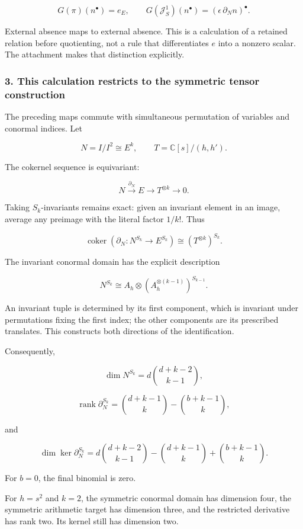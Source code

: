 \[
G(\pi)(n^\bullet)=e_E,
\qquad
G(\mathcal J_S^1)(n^\bullet)
=
(\epsilon\,\partial_Nn)^\bullet.
\]

External absence maps to external absence. This is a calculation of a retained relation before
quotienting, not a rule that differentiates \(e\) into a nonzero scalar. The attachment makes that
distinction explicitly.

\subsubsection{3. This calculation restricts to the symmetric tensor
construction}\label{conormal_tower_pasted:this-calculation-restricts-to-the-symmetric-tensor-construction}

The preceding maps commute with simultaneous permutation of variables and conormal indices. Let

\[
N=I/I^2\cong E^k,\qquad
T=\mathbb C[s]/(h,h').
\]

The cokernel sequence is equivariant:

\[
N\xrightarrow{\partial_N}E\longrightarrow T^{\otimes k}\longrightarrow0.
\]

Taking \(S_k\)-invariants remains exact: given an invariant element in an image, average any
preimage with the literal factor \(1/k!\). Thus

\[
\boxed{
\operatorname{coker}\left(
\partial_N:N^{S_k}\to E^{S_k}
\right)
\cong
(T^{\otimes k})^{S_k}.
}
\]

The invariant conormal domain has the explicit description

\[
\boxed{
N^{S_k}
\cong
A_h\otimes
(A_h^{\otimes(k-1)})^{S_{k-1}}.
}
\]

An invariant tuple is determined by its first component, which is invariant under permutations
fixing the first index; the other components are its prescribed translates. This constructs both
directions of the identification.

Consequently,

\[
\dim N^{S_k}
=
d\binom{d+k-2}{k-1},
\]

\[
\boxed{
\operatorname{rank}\partial_N^{S_k}
=
\binom{d+k-1}{k}
-
\binom{b+k-1}{k},
}
\]

and

\[
\boxed{
\dim\ker\partial_N^{S_k}
=
d\binom{d+k-2}{k-1}
-\binom{d+k-1}{k}
+\binom{b+k-1}{k}.
}
\]

For \(b=0\), the final binomial is zero.

For \(h=s^2\) and \(k=2\), the symmetric conormal domain has dimension four, the symmetric
arithmetic target has dimension three, and the restricted derivative has rank two. Its kernel still
has dimension two.

